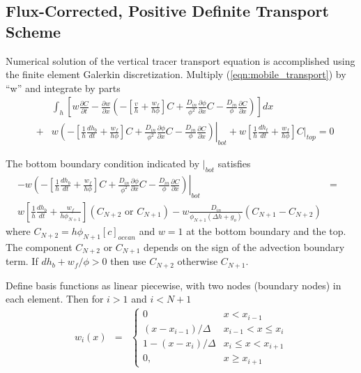 \subsection{Flux-Corrected, Positive Definite Transport
  Scheme} \label{append:tracer_numerics}
Numerical solution of the vertical tracer transport equation is
accomplished using the  finite element Galerkin discretization.
Multiply (\ref{eqn:mobile_transport}) by ``w'' and
integrate by parts
\begin{eqnarray}
& & \int_{h}\left[ w\frac{\partial C}{\partial t} -   \frac{\partial
    w}{\partial x} \left(-\left[\frac{v}{h} + \frac{w_f}{h\phi}\right]C + \frac{D_{in}}{\phi^2}\frac{\partial
      \phi}{\partial x}C  -  \frac{D_{in}}{\phi}\frac{\partial C}{\partial
      x} \right) \right]dx \nonumber \\
& + &  w\left.\left(
    -\left[\frac{1}{h}\frac{dh_b}{dt}+  \frac{w_f}{h\phi}\right]C + \frac{D_{in}}{\phi^2}\frac{\partial \phi}{\partial
    x}C -\frac{D_{in}}{\phi}\frac{\partial C}{\partial
    x}\right)\right|_{bot} + w\left[\frac{1}{h}\frac{dh_t}{dt} +
\frac{w_f}{h\phi}\right]C|_{top}  =  0
\end{eqnarray}


The bottom boundary condition indicated by $|_{bot}$ satisfies
\begin{eqnarray}
-w\left.\left(
    -\left[\frac{1}{h}\frac{dh_b}{dt}+  \frac{w_f}{h\phi}\right]C + \frac{D_{in}}{\phi^2}\frac{\partial \phi}{\partial
    x}C -\frac{D_{in}}{\phi}\frac{\partial C}{\partial
    x}\right)\right|_{bot} & = & \nonumber \\
 w\left[\frac{1}{h}\frac{dh_b}{dt} +
\frac{w_f}{h \phi_{N+1}}\right](C_{N+2} \mbox{ or }C_{N+1}) -
w\frac{D_{in}}{\phi_{N+1}(\Delta h+g_o)}\left(C_{N+1} - C_{N+2}\right) & &
\end{eqnarray}
where $C_{N+2} = h\phi_{N+1}[c]_{ocean}$ and $w = 1$ at the bottom
boundary and the top.  The component $C_{N+2}$ or $C_{N+1}$ depends on
the sign of the advection boundary term.  If $dh_b + w_f/\phi > 0$
then use $C_{N+2}$ otherwise $C_{N+1}$.

Define basis functions as linear piecewise, with two nodes
(boundary nodes) in each element. Then for  $i > 1$ and $i < N+1$
\begin{eqnarray}
w_i(x) & = & \left\{ \begin{array}{llll}
0 & x < x_{i-1} \\
(x - x_{i-1})/\Delta & x_{i-1}< x \leq x_{i} \\
1 - (x-x_i)/\Delta & x_i \leq x < x_{i+1} \\
0, & x \geq x_{i+1}
\end{array}
\right.
\end{eqnarray}

